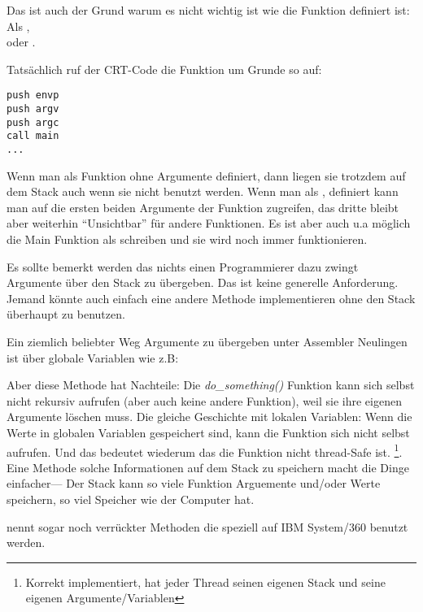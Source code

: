 \par
Das ist auch der Grund warum es nicht wichtig ist wie die \main Funktion definiert ist: Als \main, \\
 oder .

Tatsächlich ruf der \ac{CRT}-Code die \main Funktion um Grunde so auf:
	
\begin{lstlisting}[style=customasmx86]
push envp
push argv
push argc
call main
...
\end{lstlisting}

Wenn man \main als \main Funktion ohne Argumente definiert, dann liegen sie trotzdem auf dem Stack auch wenn sie 
nicht benutzt werden. Wenn man \main als , definiert kann man auf die ersten beiden
Argumente der Funktion zugreifen, das dritte bleibt aber weiterhin ``Unsichtbar'' für andere Funktionen.
Es ist aber auch u.a möglich die Main Funktion als  schreiben und sie wird noch immer funktionieren.


Es sollte bemerkt werden das nichts einen Programmierer dazu zwingt Argumente über den Stack zu übergeben. Das ist
keine generelle Anforderung. Jemand könnte auch einfach eine andere Methode implementieren ohne den Stack überhaupt zu benutzen.

Ein ziemlich beliebter Weg Argumente zu übergeben unter Assembler Neulingen ist über globale Variablen wie z.B:



Aber diese Methode hat Nachteile: Die \emph{do\_something()} Funktion kann sich selbst nicht rekursiv aufrufen (aber auch keine andere Funktion),
weil sie ihre eigenen Argumente löschen muss.
Die gleiche Geschichte mit lokalen Variablen: Wenn die Werte in globalen Variablen gespeichert sind, kann die Funktion sich nicht selbst aufrufen.
Und das bedeutet wiederum das die Funktion nicht thread-Safe ist.
\footnote{Korrekt implementiert, hat jeder Thread seinen eigenen Stack und seine eigenen Argumente/Variablen}.
Eine Methode solche Informationen auf dem Stack zu speichern macht die Dinge einfacher--- Der Stack kann so viele Funktion Arguemente und/oder Werte speichern,
so viel Speicher wie der Computer hat.

 nennt sogar noch verrückter Methoden die speziell auf IBM System/360 benutzt werden.


